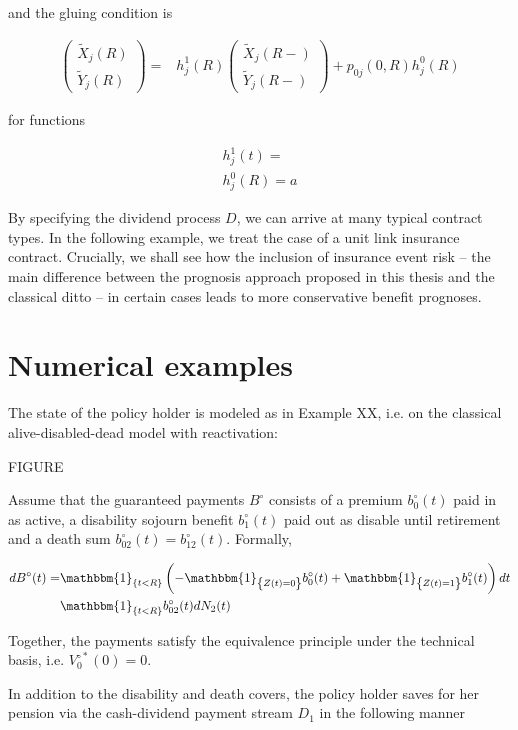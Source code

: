 \documentclass{book}
\newcommand{\1}[1]{\mathbbm{1}_{\left\lbrace #1 \right\rbrace}}
\theoremstyle{break}
\theoremstyle{remark}
\numberwithin{equation}{section}
\begin{document}
and the gluing condition is

\begin{align*}
\begin{pmatrix}\tilde{X}_j(R) \\ \tilde{Y}_j(R)\end{pmatrix} =& h_j^1(R) \begin{pmatrix}\tilde{X}_j(R-) \\ \tilde{Y}_j(R-)\end{pmatrix} + p_{0j}(0,R) h_j^0(R)
\end{align*}

for functions

\begin{align*}
	h_j^1(t) = \\
	h_j^0(R) = a
\end{align*}

By specifying the dividend process $D$, we can arrive at many typical contract types. In the following example, we treat the case of a unit link insurance contract. Crucially, we shall see how the inclusion of insurance event risk -- the main difference between the prognosis approach proposed in this thesis and the classical ditto -- in certain cases leads to more conservative benefit prognoses.

\section{Numerical examples}
	
The state of the policy holder is modeled as in Example XX, i.e. on the classical alive-disabled-dead model with reactivation:

FIGURE

Assume that the guaranteed payments $B^\circ$ consists of a premium $b_0^\circ(t)$ paid in as active, a disability sojourn benefit $b_1^\circ(t)$ paid out as disable until retirement and a death sum $b_{02}^\circ(t)=b_{12}^\circ(t)$. Formally,

\begin{align*}
	dB^\circ(t) =& \1{t<R} \left( - \1{Z(t)=0} b_0^\circ(t) + \1{Z(t)=1} b_1^\circ(t) \right) dt \\
	& \1{t < R} b_{02}^\circ(t) dN_2(t) \\
\end{align*}

Together, the payments satisfy the equivalence principle under the technical basis, i.e. $V_0^{\circ*}(0)=0$.

In addition to the disability and death covers, the policy holder saves for her pension via the cash-dividend payment stream $D_1$ in the following manner
\end{document}
